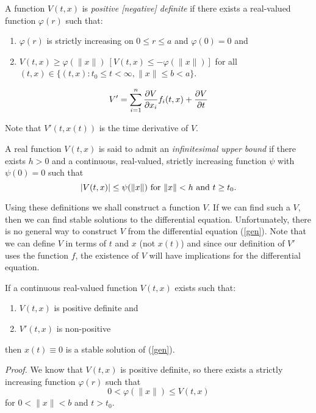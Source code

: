 \documentclass[12pt]{article}
\def\e{there exists }
\def\pf{{\em Proof. }}
\def\vphi{\varphi}
\begin{document}
\begin{dfn}
	A function $V(t,x)$ is {\em positive [negative]
definite} if \e a real-valued function $\vphi (r)$ such that:

\begin{enumerate}
\item $\vphi (r)$ is strictly increasing on $0 \le r \le a$ and
$\vphi (0) = 0$ and
\item $V(t,x) \ge \vphi ( \| x \| ) \ [V(t,x) \le - \vphi ( \| x \| )]$
for all $(t,x) \in \{ (t,x): t_0 \le t < \infty, \| x \| \le b < a \}$.  
\end{enumerate}

\end{dfn}
	
\begin{dfn}
	$$V' = \sum^n_{i=1} {\partial V \over \partial x_i} f_i(t,x) +
{\partial V \over \partial t}$$
\end{dfn}
Note that $V'(t,x(t))$ is the time derivative of $V$.

\begin{dfn}
	A real function $V(t,x)$ is said to admit an {\em infinitesimal upper bound} if \e
$h > 0$ and a continuous, real-valued, strictly increasing function
$\psi$ with $\psi (0) = 0$ such that 
$$|V(t,x)| \le \psi( \| x \|) \ {\rm for} \ \| x \| < h \ {\rm and} \
t \ge t_0.$$
\end{dfn}

Using these definitions we shall construct a function $V$.  If we can
find such a $V$, then we can find stable solutions to the differential
equation.  Unfortunately, there is no general way to construct $V$
from the differential equation (\ref{gen}).  Note that we can define
$V$ in terms of $t$ and $x$ (not $x(t)$) and since our definition of $V'$
uses the function $f$, the existence of $V$ will have implications for
the differential equation.

\begin{thm}
	If a continuous real-valued function $V(t,x)$ exists such that:
\begin{enumerate}
\item $V(t,x)$ is positive definite and
\item $V'(t,x)$ is non-positive
\end{enumerate}
then $x(t) \equiv 0$ is a stable solution of (\ref{gen}).
\end{thm}

\pf We know that $V(t,x)$ is positive definite, so \e a strictly
increasing function $\vphi (r)$ such that 
$$0 < \vphi (\| x \| ) \le V(t,x)$$
for $0 < \| x \| < b$ and $t > t_0$.
\end{document}
